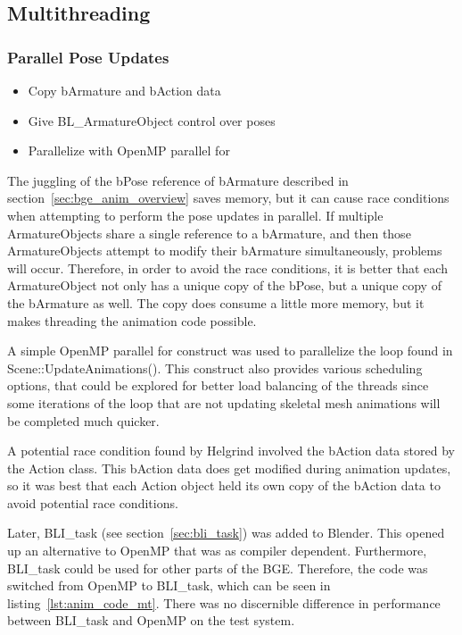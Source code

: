 \subsection{Multithreading}
\subsubsection{Parallel Pose Updates}
\ifsummaries
\begin{itemize}
 \item Copy bArmature and bAction data
 \item Give BL\_ArmatureObject control over poses
 \item Parallelize with OpenMP parallel for
\end{itemize}
\fi

The juggling of the bPose reference of bArmature described in section~\ref{sec:bge_anim_overview} saves memory, but it can cause race conditions when attempting to perform the pose updates in parallel.
If multiple ArmatureObjects share a single reference to a bArmature, and then those ArmatureObjects attempt to modify their bArmature simultaneously, problems will occur.
Therefore, in order to avoid the race conditions, it is better that each ArmatureObject not only has a unique copy of the bPose, but a unique copy of the bArmature as well.
The copy does consume a little more memory, but it makes threading the animation code possible.

A simple OpenMP parallel for construct was used to parallelize the loop found in Scene::UpdateAnimations().
This construct also provides various scheduling options, that could be explored for better load balancing of the threads since some iterations of the loop that are not updating skeletal mesh animations will be completed much quicker.

A potential race condition found by Helgrind involved the bAction data stored by the Action class.
This bAction data does get modified during animation updates, so it was best that each Action object held its own copy of the bAction data to avoid potential race conditions.

Later, BLI\_task (see section~\ref{sec:bli_task}) was added to Blender.
This opened up an alternative to OpenMP that was as compiler dependent.
Furthermore, BLI\_task could be used for other parts of the BGE.
Therefore, the code was switched from OpenMP to BLI\_task, which can be seen in listing~\ref{lst:anim_code_mt}.
There was no discernible difference in performance between BLI\_task and OpenMP on the test system.

